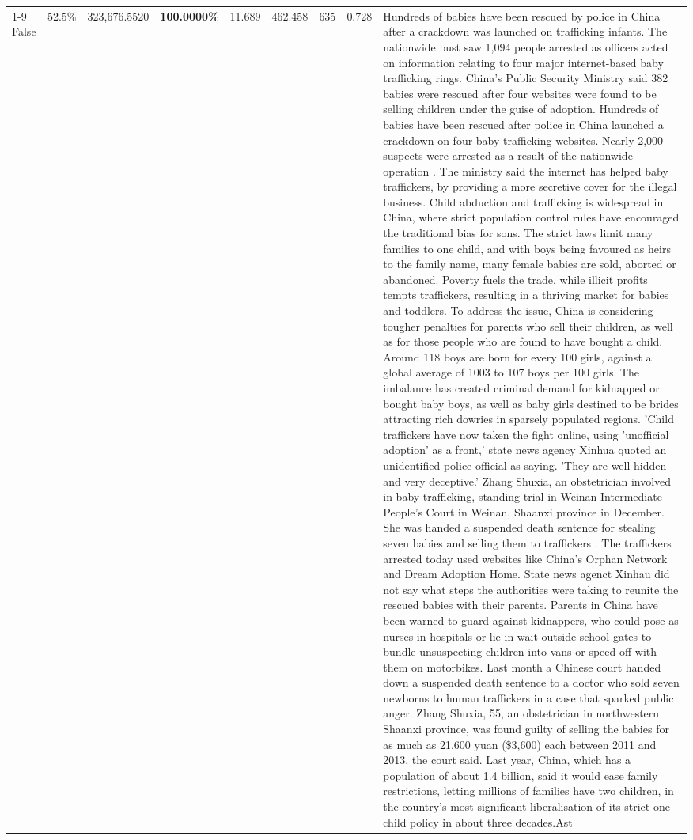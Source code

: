 \begin{table}[H]
\begin{tabular}{lllrlllll}
\cline{1-9}
False & 52.5\% & 323,676.5520 & \bfseries \color{red} 100.0000\% & 11.689 & 462.458 & 635 & 0.728 & Hundreds of babies have been rescued by police in China after a crackdown was launched on trafficking infants. The nationwide bust saw 1,094 people arrested as officers acted on information relating to four major internet-based baby trafficking rings. China's Public Security Ministry said 382 babies were rescued after four websites were found to be selling children under the guise of adoption. Hundreds of babies have been rescued after police in China launched a crackdown on four baby trafficking websites. Nearly 2,000 suspects were arrested as a result of the nationwide operation . The ministry said the internet has helped baby traffickers, by providing a more secretive cover for the illegal business. Child abduction and trafficking is widespread in China, where strict population control rules have encouraged the traditional bias for sons. The strict laws limit many families to one child, and with boys being favoured as heirs to the family name, many female babies are sold, aborted or abandoned. Poverty fuels the trade, while illicit profits tempts traffickers, resulting in a thriving market for babies and toddlers. To address the issue, China is considering tougher penalties for parents who sell their children, as well as for those people who are found to have bought a child. Around 118 boys are born for every 100 girls, against a global average of 1003 to 107 boys per 100 girls. The imbalance has created criminal demand for kidnapped or bought baby boys, as well as baby girls destined to be brides attracting rich dowries in sparsely populated regions. 'Child traffickers have now taken the fight online, using 'unofficial adoption' as a front,' state news agency Xinhua quoted an unidentified police official as saying. 'They are well-hidden and very deceptive.' Zhang Shuxia, an obstetrician involved in baby trafficking, standing trial in Weinan Intermediate People's Court in Weinan, Shaanxi province in December. She was handed a suspended death sentence for stealing seven babies and selling them to traffickers . The traffickers arrested today used websites like China's Orphan Network and Dream Adoption Home. State news agenct Xinhau did not say what steps the authorities were taking to reunite the rescued babies with their parents. Parents in China have been warned to guard against kidnappers, who could pose as nurses in hospitals or lie in wait outside school gates to bundle unsuspecting children into vans or speed off with them on motorbikes. Last month a Chinese court handed down a suspended death sentence to a doctor who sold seven newborns to human traffickers in a case that sparked public anger. Zhang Shuxia, 55, an obstetrician in northwestern Shaanxi province, was found guilty of selling the babies for as much as 21,600 yuan (\$3,600) each between 2011 and 2013, the court said. Last year, China, which has a population of about 1.4 billion, said it would ease family restrictions, letting millions of families have two children, in the country's most significant liberalisation of its strict one-child policy in about three decades.Ast \\

\end{tabular}
\end{table}
